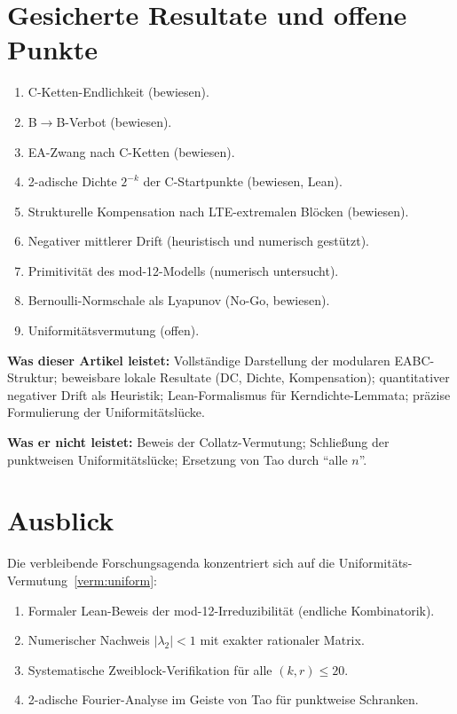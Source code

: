 \documentclass[12pt,a4paper]{article}
\begin{document}
\section{Gesicherte Resultate und offene Punkte}
\label{sec:resultate}

\begin{enumerate}
\item C-Ketten-Endlichkeit (bewiesen).
\item B$\to$B-Verbot (bewiesen).
\item EA-Zwang nach C-Ketten (bewiesen).
\item 2-adische Dichte $2^{-k}$ der C-Startpunkte (bewiesen, Lean).
\item Strukturelle Kompensation nach LTE-extremalen Blöcken (bewiesen).
\item Negativer mittlerer Drift (heuristisch und numerisch gestützt).
\item Primitivität des mod-12-Modells (numerisch untersucht).
\item Bernoulli-Normschale als Lyapunov (No-Go, bewiesen).
\item Uniformitätsvermutung (offen).
\end{enumerate}

\begin{tcolorbox}[kern]
\textbf{Was dieser Artikel leistet:} Vollständige Darstellung der modularen
EABC-Struktur; beweisbare lokale Resultate (DC, Dichte, Kompensation);
quantitativer negativer Drift als Heuristik; Lean-Formalismus für
Kerndichte-Lemmata; präzise Formulierung der Uniformitätslücke.

\textbf{Was er nicht leistet:} Beweis der Collatz-Vermutung; Schließung
der punktweisen Uniformitätslücke; Ersetzung von Tao durch ``alle $n$''.
\end{tcolorbox}

\section{Ausblick}
\label{sec:ausblick}

Die verbleibende Forschungsagenda konzentriert sich auf die
Uniformitäts-Vermutung~\ref{verm:uniform}:
\begin{enumerate}
  \item Formaler Lean-Beweis der mod-12-Irreduzibilität (endliche Kombinatorik).
  \item Numerischer Nachweis $|\lambda_2| < 1$ mit exakter rationaler Matrix.
  \item Systematische Zweiblock-Verifikation für alle $(k,r) \leq 20$.
  \item 2-adische Fourier-Analyse im Geiste von Tao für punktweise Schranken.
\end{enumerate}
\end{document}

